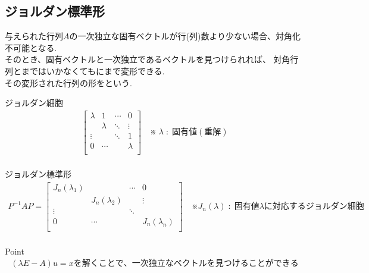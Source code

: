 \documentclass[a4paper]{jsarticle}
\begin{document}
\subsection{ジョルダン標準形}
与えられた行列$A$の一次独立な固有ベクトルが行(列)数より少ない場合、対角化不可能となる.\\
そのとき、固有ベクトルと一次独立であるベクトルを見つけられれば、
対角行列とまではいかなくてもにまで変形できる.\\
その変形された行列の形をという.
\begin{itembox}[l]{ジョルダン細胞}
    \begin{eqnarray*}
        \begin{bmatrix}
            \lambda & 1       & \cdots & 0       \\
                    & \lambda & \ddots & \vdots  \\
            \vdots  &         & \ddots & 1       \\
            0       & \cdots  &        & \lambda \\
        \end{bmatrix}
        \quad ※\; \lambda\; :\; 固有値(重解)\\
    \end{eqnarray*}
\end{itembox}
\begin{itembox}[l]{ジョルダン標準形}
    \begin{eqnarray*}
        P^{-1}AP
        =
        \begin{bmatrix}
            J_n\left(\lambda_1\right) &                           & \cdots & 0                         \\
                                      & J_n\left(\lambda_2\right) &        & \vdots                    \\
            \vdots                    &                           & \ddots &                           \\
            0                         & \cdots                    &        & J_n\left(\lambda_n\right) \\
        \end{bmatrix}
        \quad ※ J_n\left(\lambda\right)\; :\; 固有値 \lambda に対応するジョルダン細胞 \\
    \end{eqnarray*}
\end{itembox}
\begin{itembox}[l]{Point}
    \begin{eqnarray*}
        \left(\lambda E - A\right) u=x を解くことで、一次独立なベクトルを見つけることができる\\
    \end{eqnarray*}
\end{itembox}
\end{document}
